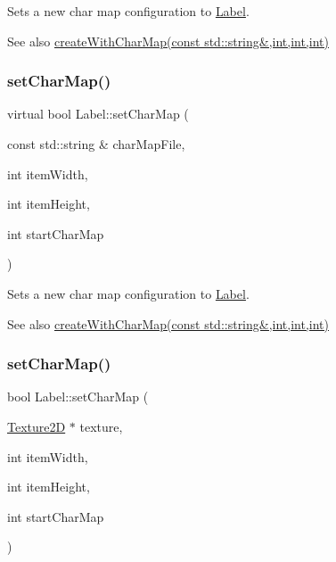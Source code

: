 Sets a new char map configuration to \hyperlink{classLabel}{Label}.

\begin{DoxySeeAlso}{See also}
{\ttfamily \hyperlink{classLabel_a96c96d48eb5969f2fe3ab396b53905e1}{create\+With\+Char\+Map(const std\+::string\&,int,int,int)}} 
\end{DoxySeeAlso}
\mbox{\label{classLabel_a580968d9d76fdf5e78a50feb6a619522}} 
\subsubsection{\texorpdfstring{set\+Char\+Map()}{setCharMap()}\hspace{0.1cm}{\footnotesize\ttfamily [2/6]}}
{\footnotesize\ttfamily virtual bool Label\+::set\+Char\+Map (\begin{DoxyParamCaption}\item[{const std\+::string \&}]{char\+Map\+File,  }\item[{int}]{item\+Width,  }\item[{int}]{item\+Height,  }\item[{int}]{start\+Char\+Map }\end{DoxyParamCaption})\hspace{0.3cm}{\ttfamily [virtual]}}

Sets a new char map configuration to \hyperlink{classLabel}{Label}.

\begin{DoxySeeAlso}{See also}
{\ttfamily \hyperlink{classLabel_a96c96d48eb5969f2fe3ab396b53905e1}{create\+With\+Char\+Map(const std\+::string\&,int,int,int)}} 
\end{DoxySeeAlso}
\mbox{\label{classLabel_a445b80755fe7a59d8571e8ec25e2c365}} 
\subsubsection{\texorpdfstring{set\+Char\+Map()}{setCharMap()}\hspace{0.1cm}{\footnotesize\ttfamily [3/6]}}
{\footnotesize\ttfamily bool Label\+::set\+Char\+Map (\begin{DoxyParamCaption}\item[{\hyperlink{classTexture2D}{Texture2D} $\ast$}]{texture,  }\item[{int}]{item\+Width,  }\item[{int}]{item\+Height,  }\item[{int}]{start\+Char\+Map }\end{DoxyParamCaption})\hspace{0.3cm}{\ttfamily [virtual]}}

